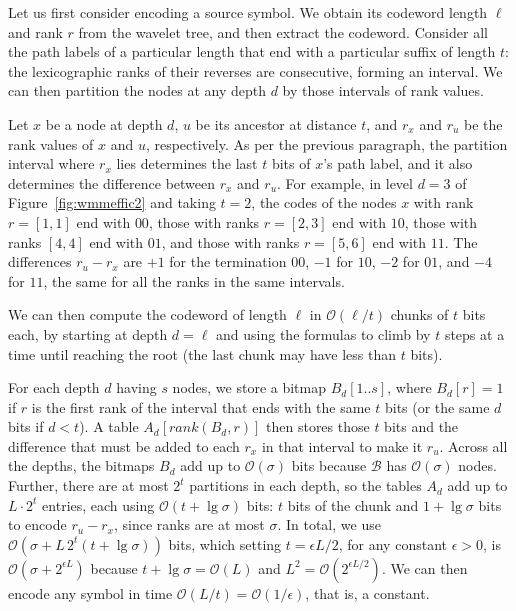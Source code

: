 \documentclass[preprint,12pt]{elsarticle}
\newcommand{\Oh}[1]{\ensuremath{\mathcal{O}\!\left({#1}\right)}}
\newcommand{\B}{\mathcal{B}}
\renewcommand{\log}{\lg}
\begin{document}
Let us first consider encoding a source symbol. We obtain its codeword length
$\ell$ and rank $r$ from the wavelet tree, and then extract the codeword.
Consider all the path labels of a particular length that end with a particular 
suffix of length $t$: the lexicographic ranks of their reverses are consecutive,
forming an interval. We can then partition the nodes at any depth $d$ by 
those intervals of rank values. 

Let $x$ be a node at depth $d$, $u$ be its ancestor at distance $t$, and $r_x$ 
and $r_u$ be the rank values of $x$ and $u$, respectively. As per the previous
paragraph, the partition interval where $r_x$ lies determines the last $t$ bits
of $x$'s path label, and it also determines the difference between $r_x$ and 
$r_u$. For example, in level $d=3$ of Figure~\ref{fig:wmmeffic2} and taking
$t=2$, the codes of the nodes $x$ with rank $r=[1,1]$ end with $00$, those 
with ranks $r=[2,3]$ end with $10$, those with ranks $[4,4]$ end with $01$, 
and those with ranks $r=[5,6]$ end with $11$. The differences $r_u-r_x$ are
$+1$ for the termination $00$, $-1$ for $10$, $-2$ for $01$, and $-4$ for 
$11$, the same for all the ranks in the same intervals.

We can then compute the codeword of length $\ell$ in $\Oh{\ell/t}$ chunks of $t$ bits
each, by starting at depth $d=\ell$ and using the formulas to climb by $t$ 
steps at a time until reaching the root (the last chunk may have less than $t$
bits).

For each depth $d$ having $s$ nodes, we store a bitmap $B_d[1..s]$, where
$B_d[r]=1$ if $r$ is the first rank of the interval that ends with the same 
$t$ bits (or the same $d$ bits if $d < t$). A table 
$A_d[rank(B_d,r)]$ then stores those $t$ bits and 
the difference that must be added to each $r_x$ in that interval to make it
$r_u$. Across all the depths, the bitmaps $B_d$ add up to $\Oh{\sigma}$ bits
because $\B$ has $\Oh{\sigma}$ nodes.
Further, there are at most $2^t$ partitions in each depth, so the tables 
$A_d$ add up to $L\cdot 2^t$ entries, each using $\Oh{t+\log\sigma}$ bits:
$t$ bits of the chunk and $1+\log\sigma$ bits to encode $r_u-r_x$, since 
ranks are at most $\sigma$.
In total, we use $\Oh{\sigma + L\,2^t (t+\log\sigma)}$ bits, which setting 
$t = \epsilon L/2$, for any constant $\epsilon>0$, is 
$\Oh{\sigma + 2^{\epsilon L}}$ because $t+\log\sigma = \Oh{L}$ and $L^2 =
\Oh{2^{\epsilon L/2}}$. 
We can then encode any symbol in time
$\Oh{L/t} = \Oh{1/\epsilon}$, that is, a constant.
\end{document}
